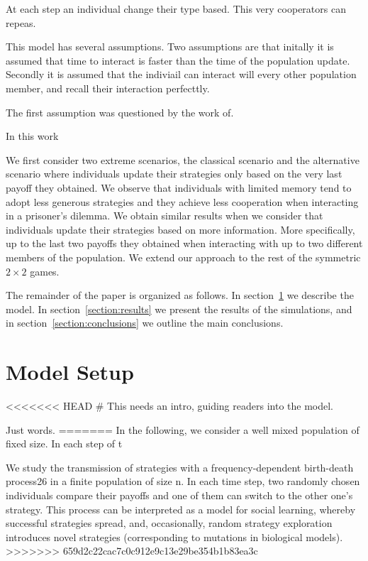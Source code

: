 \documentclass[11pt]{article}
\theoremstyle{plainCl1}
\theoremstyle{plainCl2}
\begin{document}
At each step an individual change their type based. This very cooperators
can repeas.

This model has several assumptions. Two assumptions are that initally it is
assumed that time to interact is faster than the time of the population
update. Secondly it is assumed that the indiviail can interact will every
other population member, and recall their interaction perfecttly.

The first assumption was questioned by the work of.

In this work

We first consider two extreme scenarios, the classical scenario and the
alternative scenario where individuals update their strategies only based on the
very last payoff they obtained. We observe that individuals with limited memory
tend to adopt less generous strategies and they achieve less cooperation when
interacting in a prisoner's dilemma. We obtain similar results when we consider
that individuals update their strategies based on more information. More
specifically, up to the last two payoffs they obtained when interacting with up
to two different members of the population. We extend our approach to the rest
of the symmetric \(2 \times 2\) games.

The remainder of the paper is organized as follows. In
section~\ref{section:model} we describe the model. In
section~\ref{section:results} we present the results of the simulations, and in
section~\ref{section:conclusions} we outline the main conclusions.

\section{Model Setup}\label{section:model}

<<<<<<< HEAD
# This needs an intro, guiding readers into the model.

Just words.
=======
In the following, we consider a well mixed population of fixed size. In each
step of t

We study the transmission of strategies with a frequency-dependent birth-death
process26 in a finite population of size n. In each time step, two randomly
chosen individuals compare their payoffs and one of them can switch to the other
one's strategy. This process can be interpreted as a model for social learning,
whereby successful strategies spread, and, occasionally, random strategy
exploration introduces novel strategies (corresponding to mutations in
biological models).
>>>>>>> 659d2c22cac7c0c912e9c13e29be354b1b83ea3c
\end{document}
